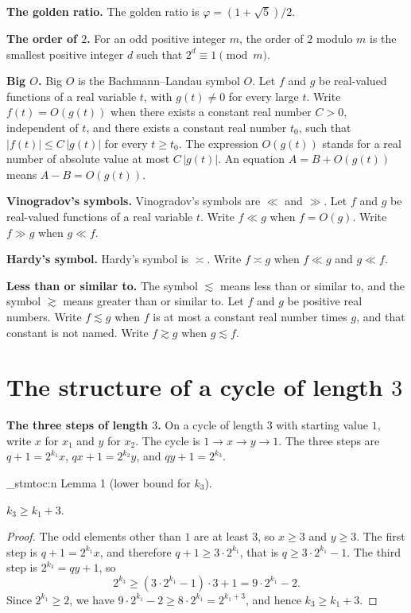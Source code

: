 \documentclass[11pt]{article}
\newenvironment{named}[1]{%
  \par\addvspace{\medskipamount}%
  \pagebreak[3]%
  \noindent{\bfseries #1}\space\ignorespaces
  \stmtoc{#1}%
}{\par\addvspace{\medskipamount}}
\newcommand{\topic}[1]{\par\noindent\textbf{#1}}
\newcommand{\stmtoc}[1]{ \qn_stmtoc:n {#1} }
\begin{document}
\topic{The golden ratio.}
The golden ratio is $\varphi = (1 + \sqrt{5})/2$.

\topic{The order of $2$.}
For an odd positive integer $m$, the order of $2$ modulo $m$ is the smallest positive integer $d$ such that $2^d \equiv 1 \pmod{m}$.

\topic{Big $O$.}
Big $O$ is the Bachmann--Landau symbol $O$.
Let $f$ and $g$ be real-valued functions of a real variable $t$, with $g(t) \ne 0$ for every large $t$.
Write $f(t) = O(g(t))$ when there exists a constant real number $C > 0$, independent of $t$, and there exists a constant real number $t_0$, such that $|f(t)| \le C\,|g(t)|$ for every $t \ge t_0$.
The expression $O(g(t))$ stands for a real number of absolute value at most $C\,|g(t)|$.
An equation $A = B + O(g(t))$ means $A - B = O(g(t))$.

\topic{Vinogradov's symbols.}
Vinogradov's symbols are $\ll$ and $\gg$.
Let $f$ and $g$ be real-valued functions of a real variable $t$.
Write $f \ll g$ when $f = O(g)$.
Write $f \gg g$ when $g \ll f$.

\topic{Hardy's symbol.}
Hardy's symbol is $\asymp$.
Write $f \asymp g$ when $f \ll g$ and $g \ll f$.

\topic{Less than or similar to.}
The symbol $\lesssim$ means less than or similar to, and the symbol $\gtrsim$ means greater than or similar to.
Let $f$ and $g$ be positive real numbers.
Write $f \lesssim g$ when $f$ is at most a constant real number times $g$, and that constant is not named.
Write $f \gtrsim g$ when $g \lesssim f$.

\section{The structure of a cycle of length $3$}
\label{sec:structure}

\topic{The three steps of length $3$.}
On a cycle of length $3$ with starting value $1$, write $x$ for $x_1$ and $y$ for $x_2$.
The cycle is $1 \to x \to y \to 1$.
The three steps are $q + 1 = 2^{k_1} x$, $qx + 1 = 2^{k_2} y$, and $qy + 1 = 2^{k_3}$.

\begin{named}{Lemma 1 (lower bound for $k_3$).}
$k_3 \ge k_1 + 3$.
\end{named}

\begin{proof}
The odd elements other than $1$ are at least $3$, so $x \ge 3$ and $y \ge 3$.
The first step is $q + 1 = 2^{k_1} x$, and therefore $q + 1 \ge 3 \cdot 2^{k_1}$, that is $q \ge 3 \cdot 2^{k_1} - 1$.
The third step is $2^{k_3} = qy + 1$, so
\[
2^{k_3} \ge (3 \cdot 2^{k_1} - 1) \cdot 3 + 1 = 9 \cdot 2^{k_1} - 2.
\]
Since $2^{k_1} \ge 2$, we have $9 \cdot 2^{k_1} - 2 \ge 8 \cdot 2^{k_1} = 2^{k_1 + 3}$, and hence $k_3 \ge k_1 + 3$.
\end{proof}
\end{document}
